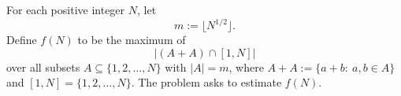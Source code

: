 For each positive integer $N$, let
\[
m := \lfloor N^{1/2}\rfloor.
\]
Define $f(N)$ to be the maximum of
\[
|(A+A)\cap [1,N]|
\]
over all subsets $A\subseteq\{1,2,\dots,N\}$ with $|A|=m$, where $A+A:=\{a+b:\ a,b\in A\}$ and $[1,N]=\{1,2,\dots,N\}$.
The problem asks to estimate $f(N)$.

